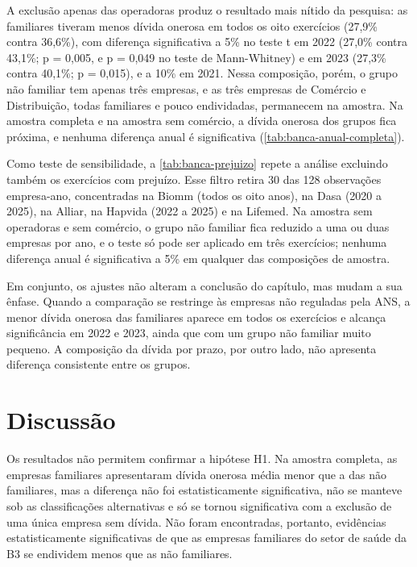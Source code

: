 

A exclusão apenas das operadoras produz o resultado mais nítido da pesquisa: as
familiares tiveram menos dívida onerosa em todos os oito exercícios (27,9\% contra
36,6\%), com diferença significativa a 5\% no teste t em 2022 (27,0\% contra 43,1\%;
p = 0,005, e p = 0,049 no teste de Mann-Whitney) e em 2023 (27,3\% contra 40,1\%;
p = 0,015), e a 10\% em 2021. Nessa composição, porém, o grupo não familiar tem
apenas três empresas, e as três empresas de Comércio e Distribuição, todas
familiares e pouco endividadas, permanecem na amostra. Na amostra completa e na
amostra sem comércio, a dívida onerosa dos grupos fica próxima, e nenhuma diferença
anual é significativa (\autoref{tab:banca-anual-completa}).



Como teste de sensibilidade, a \autoref{tab:banca-prejuizo} repete a análise
excluindo também os exercícios com prejuízo. Esse filtro retira 30 das 128
observações empresa-ano, concentradas na Biomm (todos os oito anos), na Dasa (2020 a
2025), na Alliar, na Hapvida (2022 a 2025) e na Lifemed. Na amostra sem operadoras
e sem comércio, o grupo não familiar fica reduzido a uma ou duas empresas por ano,
e o teste só pode ser aplicado em três exercícios; nenhuma diferença anual é
significativa a 5\% em qualquer das composições de amostra.



Em conjunto, os ajustes não alteram a conclusão do capítulo, mas mudam a sua
ênfase. Quando a comparação se restringe às empresas não reguladas pela ANS, a
menor dívida onerosa das familiares aparece em todos os exercícios e alcança
significância em 2022 e 2023, ainda que com um grupo não familiar muito pequeno. A
composição da dívida por prazo, por outro lado, não apresenta diferença
consistente entre os grupos.

\section{Discussão}\label{sec:discussao}

Os resultados não permitem confirmar a hipótese H1. Na amostra completa, as
empresas familiares apresentaram dívida onerosa média menor que a das não
familiares, mas a diferença não foi estatisticamente significativa, não se manteve
sob as classificações alternativas e só se tornou significativa com a exclusão de
uma única empresa sem dívida. Não foram encontradas, portanto, evidências
estatisticamente significativas de que as empresas familiares do setor de saúde da
B3 se endividem menos que as não familiares.

